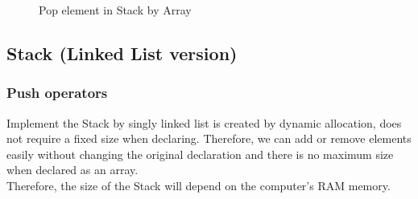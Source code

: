 \begin{figure}[H]
    \centering
    \qquad
    \caption{Pop element in Stack by Array}%
    \label{fig:stackArrayPop}%
\end{figure}

\subsection{Stack (Linked List version)}

\subsubsection{Push operators}
Implement the Stack by singly linked list is created by dynamic allocation, does not require a fixed size when declaring. Therefore, we can add or remove elements easily without changing the original declaration and there is no maximum size when declared as an array.\\
Therefore, the size of the Stack will depend on the computer's RAM memory.\\

